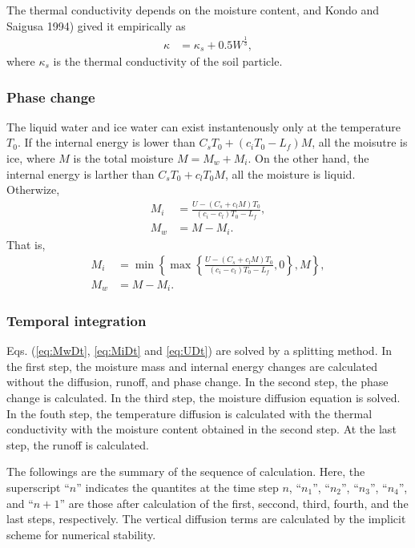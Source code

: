 The thermal conductivity depends on the moisture content, and Kondo and Saigusa 1994) gived it empirically as
\begin{align}
  \kappa &= \kappa_s + 0.5 W^\frac{1}{3},
\end{align}
where $\kappa_s$ is the thermal conductivity of the soil particle.



\subsubsection{Phase change}
The liquid water and ice water can exist instantenously only at the temperature $T_0$.
If the internal energy is lower than $C_sT_0 + (c_i T_0 - L_f) M$, all the moisutre is ice, where $M$ is the total moisture $M=M_w+M_i$.
On the other hand, the internal energy is larther than $C_sT_0 + c_lT_0M$, all the moisture is liquid.
Otherwize,
\begin{align}
 M_i &= \frac{U - ( C_s + c_l M ) T_0}{ (c_i-c_l)T_0 - L_f}, \\
 M_w &= M - M_i.
\end{align}
That is,
\begin{align}
 M_i &= \min\left\{ \max\left\{ \frac{U-(C_s+c_lM)T_0}{(c_i-c_l)T_0-L_f}, 0 \right\}, M \right\}, \\
 M_w &= M - M_i.
\end{align}


\subsubsection{Temporal integration}
Eqs. (\ref{eq:MwDt}, \ref{eq:MiDt} and \ref{eq:UDt}) are solved by a splitting method.
In the first step, the moisture mass and internal energy changes are calculated without the diffusion, runoff, and phase change.
In the second step, the phase change is calculated.
In the third step, the moisture diffusion equation is solved.
In the fouth step, the temperature diffusion is calculated with the thermal conductivity with the moisture content obtained in the second step.
At the last step, the runoff is calculated.


The followings are the summary of the sequence of calculation.
Here, the superscript ``$n$'' indicates the quantites at the time step $n$, ``$n_1$'', ``$n_2$'', ``$n_3$'', ``$n_4$'', and ``$n+1$'' are those after calculation of the first, seccond, third, fourth, and the last steps, respectively.
The vertical diffusion terms are calculated by the implicit scheme for numerical stability.

